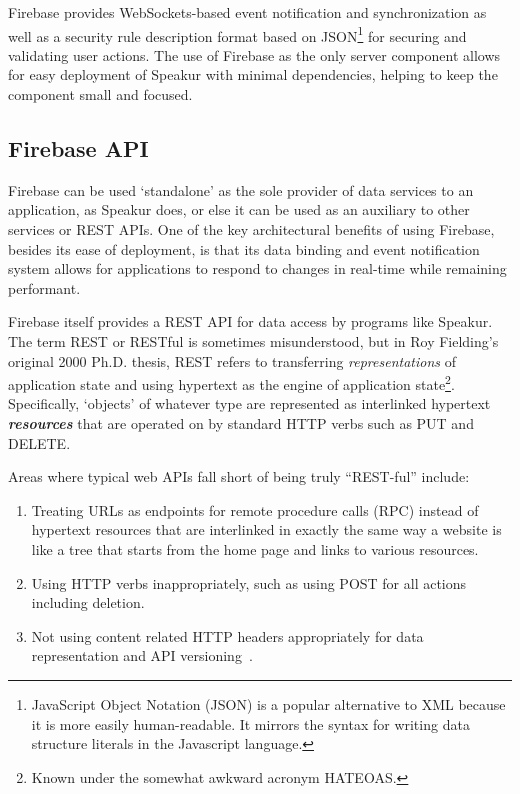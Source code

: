 Firebase provides WebSockets-based event notification and synchronization 
as well as a security rule description format based on 
JSON\footnote{JavaScript Object Notation (JSON) is a popular alternative to XML because it is more easily human-readable. 
It mirrors the syntax for writing data structure literals in the Javascript language.} 
for securing and validating user actions.
The use of Firebase as the only server component allows for easy deployment of Speakur with minimal dependencies, helping to keep the component small and focused.

\subsection{Firebase API}
Firebase can be used `standalone' as the sole provider of data services to an application, as Speakur does, or else it can be used as an auxiliary to other services or REST APIs.
One of the key architectural benefits of using Firebase, 
besides its ease of deployment, 
is that its data binding and event notification system allows for 
applications to respond to changes in real-time while remaining performant.

Firebase itself provides a REST API for data access by programs like Speakur.
The term REST or RESTful is sometimes misunderstood,
but in Roy Fielding's original 2000 Ph.D. thesis, 
REST refers to transferring \textit{representations} of application state and using hypertext as the engine of 
application state\footnote{Known under the somewhat awkward acronym HATEOAS.}.
Specifically, `objects' of whatever type are represented as interlinked hypertext \textbf{\textit{resources}} that are operated on by standard HTTP verbs such as PUT and DELETE.

Areas where typical web APIs fall short of being truly ``REST-ful'' include:
\begin{enumerate}
\item Treating URLs as endpoints for remote procedure calls (RPC) instead of hypertext resources that are interlinked in exactly the same way a website is like a tree that starts from the home page and links to various resources.
\item Using HTTP verbs inappropriately, such as using POST for all actions including deletion.
\item Not using content related HTTP headers appropriately for data representation and API versioning~\cite{steveklabnik2011}.
\end{enumerate}

